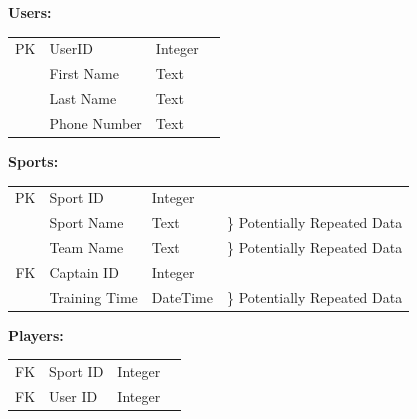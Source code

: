 \documentclass[10pt]{article}
\begin{document}
                \begin{center}
                    \textbf{Users:}\\
                    \begin{tabular}{ | r | l | l | p{10cm} } 
                        \cline{1-3}
                        PK & UserID & Integer & \\ \cline{1-3}
                        & First Name & Text & \\ \cline{1-3}
                        & Last Name & Text & \\ \cline{1-3}
                        & Phone Number & Text & \\ \cline{1-3}
                    \end{tabular}
                \end{center}

                \begin{center}
                    \textbf{Sports:}\\
                    \begin{tabular}{ | r | l | l | p{10cm} } 
                        \cline{1-3}
                        PK & Sport ID & Integer & \\ \cline{1-3}
                        & Sport Name & Text & \} Potentially Repeated Data \\ \cline{1-3}
                        & Team Name & Text & \} Potentially Repeated Data \\ \cline{1-3}
                        FK & Captain ID & Integer & \\ \cline{1-3}
                        & Training Time & DateTime & \} Potentially Repeated Data \\ \cline{1-3}
                    \end{tabular}
                \end{center}

                \begin{center}
                    \textbf{Players:}\\
                    \begin{tabular}{ | r | l | l | p{10cm} } 
                        \cline{1-3}
                        FK & Sport ID & Integer & \\ \cline{1-3}
                        FK & User ID & Integer & \\ \cline{1-3}
                    \end{tabular}
                \end{center}
\end{document}
